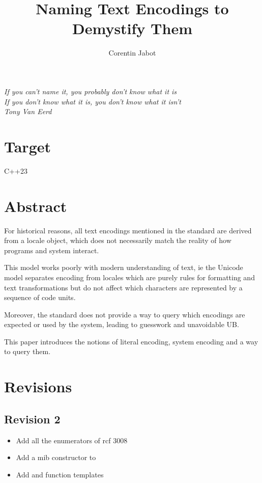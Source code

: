 \documentclass{wg21}
\title{Naming Text Encodings to Demystify Them}
\author{Corentin Jabot}{corentin.jabot@gmail.com}
\begin{document}
\maketitle

\begin{flushright}
    \hfill \break
    \hfill \break
    \textit{If you can't name it, you probably don't know what it is\\
    	If you don't know what it is, you don't know what it isn't\\
    	Tony Van Eerd}
\end{flushright}


\section{Target}

C++23

\section{Abstract}

For historical reasons, all text encodings mentioned in the standard are derived from
a locale object, which does not necessarily match the reality of how programs and system interact.

This model works poorly with modern understanding of text, ie the Unicode model separates encoding
from locales which are purely rules for formatting and text transformations but do not affect
which characters are represented by a sequence of code units.

Moreover, the standard does not provide a way to query which encodings are expected or used by the system,
leading to guesswork and unavoidable UB.

This paper introduces the notions of literal encoding, system encoding and a way to query them.


\section{Revisions}

\subsection*{Revision 2}
\begin{itemize}
	\item Add all the enumerators of rcf 3008
    \item Add a mib constructor to 
    \item Add  and  function templates
\end{itemize}
\end{document}
